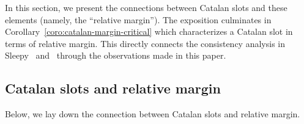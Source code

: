 

In this section, we present the connections between Catalan slots and these elements (namely, the ``relative margin''). 
The exposition culminates in Corollary~\ref{coro:catalan-margin-critical} 
which characterizes a Catalan slot in terms of relative margin. 
This directly connects the consistency analysis in Sleepy~\cite{Sleepy} 
and~\cite{LinearConsistency} through the observations made in this paper.



% 





\subsection{Catalan slots and relative margin}

  Below, we lay down the connection between Catalan slots 
  and relative margin. 
  
